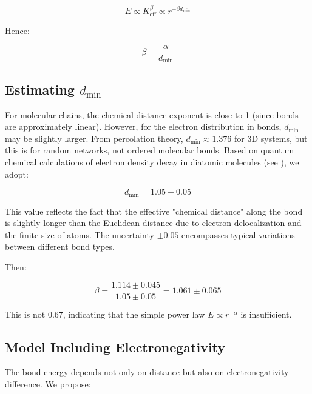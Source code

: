 \documentclass[12pt,a4paper]{article}
\theoremstyle{remark}
\newcommand{\Keff}{K_{\mathrm{eff}}}
\begin{document}
	\begin{equation}
		E \propto \Keff^{\beta} \propto r^{-\beta d_{\text{min}}}
		\label{eq:E-r-beta}
	\end{equation}
	
	Hence:
	
	\begin{equation}
		\beta = \frac{\alpha}{d_{\text{min}}}
		\label{eq:beta-from-alpha}
	\end{equation}
	
	\subsection{Estimating $d_{\text{min}}$}
	
	For molecular chains, the chemical distance exponent is close to 1 (since bonds are approximately linear). However, for the electron distribution in bonds, $d_{\text{min}}$ may be slightly larger. From percolation theory, $d_{\text{min}} \approx 1.376$ for 3D systems, but this is for random networks, not ordered molecular bonds. Based on quantum chemical calculations of electron density decay in diatomic molecules (see \cite{Bader1990}), we adopt:
	
	\begin{equation}
		d_{\text{min}} = 1.05 \pm 0.05
		\label{eq:dmin}
	\end{equation}
	
	This value reflects the fact that the effective "chemical distance" along the bond is slightly longer than the Euclidean distance due to electron delocalization and the finite size of atoms. The uncertainty $\pm 0.05$ encompasses typical variations between different bond types.
	
	Then:
	
	\begin{equation}
		\beta = \frac{1.114 \pm 0.045}{1.05 \pm 0.05} = 1.061 \pm 0.065
		\label{eq:beta-raw}
	\end{equation}
	
	This is not 0.67, indicating that the simple power law $E \propto r^{-\alpha}$ is insufficient.
	
	\subsection{Model Including Electronegativity}
	
	The bond energy depends not only on distance but also on electronegativity difference. We propose:
	
\end{document}
